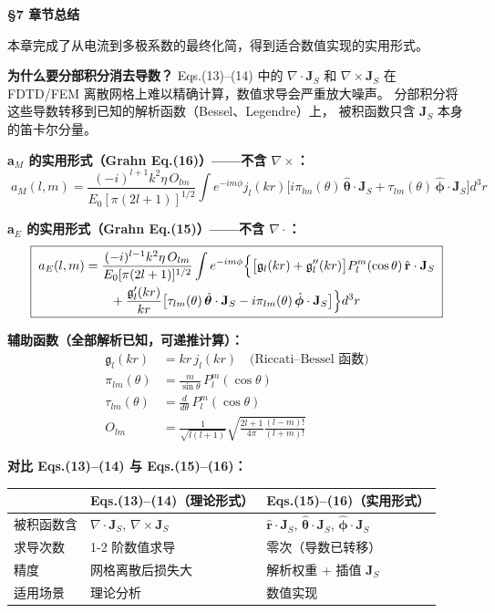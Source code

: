 \begin{chaptersummary}

\textbf{§7 章节总结}

本章完成了从电流到多极系数的最终化简，得到适合数值实现的实用形式。

\textbf{为什么要分部积分消去导数？}
Eqs.(13)--(14) 中的 $\nabla\cdot\mathbf{J}_S$ 和 $\nabla\times\mathbf{J}_S$
在 FDTD/FEM 离散网格上难以精确计算，数值求导会严重放大噪声。
分部积分将这些导数转移到已知的解析函数（Bessel、Legendre）上，
被积函数只含 $\mathbf{J}_S$ 本身的笛卡尔分量。

\textbf{a$_M$ 的实用形式（Grahn Eq.(16)）——不含 $\nabla\times$：}
$$
\boxed{\;
a_M(l,m) = \frac{(-i)^{l+1}k^2\eta\,O_{lm}}{E_0[\pi(2l+1)]^{1/2}}
\int e^{-im\phi} j_l(kr)\bigl[
i\pi_{lm}(\theta)\,\hat{\boldsymbol{\theta}}\cdot\mathbf{J}_S
+ \tau_{lm}(\theta)\,\hat{\boldsymbol{\phi}}\cdot\mathbf{J}_S
\bigr] d^3r
\;}
$$

\textbf{a$_E$ 的实用形式（Grahn Eq.(15)）——不含 $\nabla\cdot$：}
$$
\boxed{\;
\begin{aligned}
a_E(l,m) &= \frac{(-i)^{l-1}k^2\eta\,O_{lm}}{E_0[\pi(2l+1)]^{1/2}}
\int e^{-im\phi} \Bigl\{
\bigl[\mathfrak{g}_l(kr) + \mathfrak{g}_l''(kr)\bigr]P_l^m(\cos\theta)\,\hat{\mathbf{r}}\cdot\mathbf{J}_S \\
&\qquad + \frac{\mathfrak{g}_l'(kr)}{kr}\bigl[\tau_{lm}(\theta)\,\hat{\boldsymbol{\theta}}\cdot\mathbf{J}_S
- i\pi_{lm}(\theta)\,\hat{\boldsymbol{\phi}}\cdot\mathbf{J}_S\bigr]
\Bigr\} d^3r
\end{aligned}
\;}
$$

\textbf{辅助函数（全部解析已知，可递推计算）：}
\begin{align*}
\mathfrak{g}_l(kr) &= kr\,j_l(kr) \quad\text{(Riccati--Bessel 函数)} \\
\pi_{lm}(\theta) &= \frac{m}{\sin\theta}\,P_l^m(\cos\theta) \\
\tau_{lm}(\theta) &= \frac{d}{d\theta}\,P_l^m(\cos\theta) \\
O_{lm} &= \frac{1}{\sqrt{l(l+1)}}\sqrt{\frac{2l+1}{4\pi}\frac{(l-m)!}{(l+m)!}}
\end{align*}

\textbf{对比 Eqs.(13)--(14) 与 Eqs.(15)--(16)：}
\begin{center}
\begin{tabular}{lll}
 & Eqs.(13)--(14)（理论形式） & Eqs.(15)--(16)（实用形式） \\ \hline
被积函数含 & $\nabla\cdot\mathbf{J}_S$, $\nabla\times\mathbf{J}_S$ & $\hat{\mathbf{r}}\cdot\mathbf{J}_S$, $\hat{\boldsymbol{\theta}}\cdot\mathbf{J}_S$, $\hat{\boldsymbol{\phi}}\cdot\mathbf{J}_S$ \\
求导次数 & 1-2 阶数值求导 & 零次（导数已转移） \\
精度 & 网格离散后损失大 & 解析权重 + 插值 $\mathbf{J}_S$ \\
适用场景 & 理论分析 & 数值实现
\end{tabular}
\end{center}


\end{chaptersummary}
